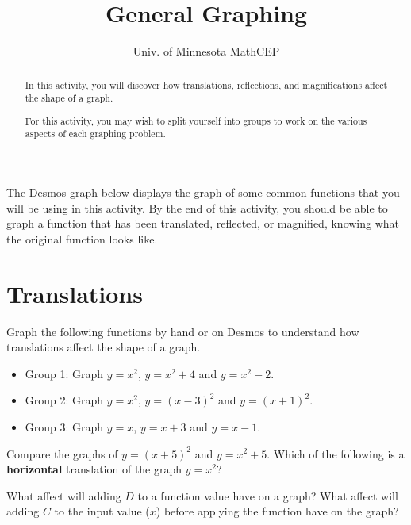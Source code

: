\documentclass[number]{ximera}
\title{General Graphing}
\author{Univ. of Minnesota MathCEP}
\begin{document}
\begin{abstract}
In this activity, you will discover how translations, reflections, and magnifications affect the shape of a graph.

For this activity, you may wish to split yourself into groups to work on the various aspects of each graphing problem.
\end{abstract}

\maketitle

The Desmos graph below displays the graph of some common functions that you will be using in this activity. By the end of this activity, you should be able to graph a function that has been translated, reflected, or magnified, knowing what the original function looks like.


\section{Translations}
\begin{problem} Graph the following functions by hand or on Desmos to understand how translations affect the shape of a graph.

\begin{itemize}
\item Group 1: Graph $y = x^2$, $y = x^2 + 4$ and $y = x^2 - 2$.
\item Group 2: Graph $y = x^2$, $y = (x-3)^2$ and $y = (x+1)^2$.
\item Group 3: Graph $y = x$, $y = x+3$ and $y=x-1$.
\end{itemize}
\end{problem}

\begin{question}
Compare the graphs of $y=(x+5)^2$ and $y=x^2+5$. Which of the following is a {\bf horizontal} translation of the graph $y=x^2$?
\begin{multipleChoice}
\end{multipleChoice}
\end{question}


\begin{question}
What affect will adding $D$ to a function value have on a graph? What affect will adding $C$ to the input value ($x$) before applying the function have on the graph?
\end{question}
\end{document}
